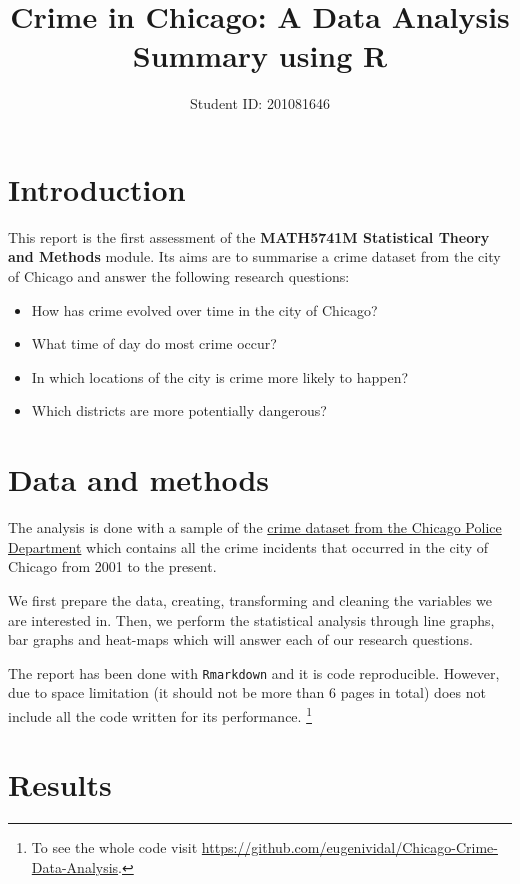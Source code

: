 \documentclass[]{article}
\title{Crime in Chicago: A Data Analysis Summary using R}
\author{Student ID: 201081646}
\date{}
\let\rmarkdownfootnote\footnote%
\def\footnote{\protect\rmarkdownfootnote}
\begin{document}
\maketitle

\section{Introduction}\label{introduction}

This report is the first assessment of the \textbf{MATH5741M Statistical
Theory and Methods} module. Its aims are to summarise a crime dataset
from the city of Chicago and answer the following research questions:

\begin{itemize}
\item
  How has crime evolved over time in the city of Chicago?
\item
  What time of day do most crime occur?
\item
  In which locations of the city is crime more likely to happen?
\item
  Which districts are more potentially dangerous?
\end{itemize}

\section{Data and methods}\label{data-and-methods}

The analysis is done with a sample of the
\href{https://data.cityofchicago.org/Public-Safety/Crimes-2001-to-present/ijzp-q8t2}{crime
dataset from the Chicago Police Department} which contains all the crime
incidents that occurred in the city of Chicago from 2001 to the present.

We first prepare the data, creating, transforming and cleaning the
variables we are interested in. Then, we perform the statistical
analysis through line graphs, bar graphs and heat-maps which will answer
each of our research questions.

The report has been done with \texttt{Rmarkdown} and it is code
reproducible. However, due to space limitation (it should not be more
than 6 pages in total) does not include all the code written for its
performance. \footnote{To see the whole code visit
  \url{https://github.com/eugenividal/Chicago-Crime-Data-Analysis}.}

\section{Results}\label{results}
\end{document}
